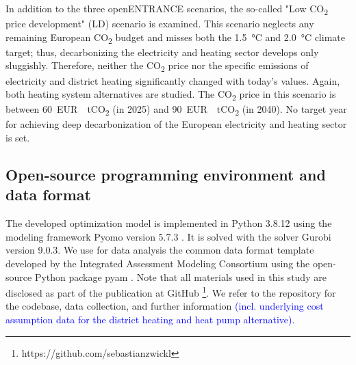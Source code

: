 In addition to the three openENTRANCE scenarios, the so-called "Low CO\textsubscript{2} price development" (LD) scenario is examined. This scenario neglects any remaining European CO\textsubscript{2} budget and misses both the  \SI{1.5}{\degreeCelsius} and \SI{2.0}{\degreeCelsius} climate target; thus, decarbonizing the electricity and heating sector develops only sluggishly. Therefore, neither the CO\textsubscript{2} price nor the specific emissions of electricity and district heating significantly changed with today's values. Again, both heating system alternatives are studied. The CO\textsubscript{2} price in this scenario is between \SI{60}{EUR \per tCO_{2}} (in 2025) and \SI{90}{EUR \per tCO_{2}} (in 2040). No target year for achieving deep decarbonization of the European electricity and heating sector is set. 

\subsection{Open-source programming environment and data format}\label{met:os}
The developed optimization model is implemented in Python 3.8.12 using the modeling framework Pyomo version 5.7.3 \cite{hart2017optimization}. It is solved with the solver Gurobi version 9.0.3. We use for data analysis the common data format template developed by the Integrated Assessment Modeling Consortium using the open-source Python package pyam \cite{huppmann2021pyam}. Note that all materials used in this study are disclosed as part of the publication at GitHub \footnote{https://github.com/sebastianzwickl}. We refer to the repository \textcolor{blue}{\cite{zwickl}} for the codebase, data collection, and further information \textcolor{blue}{(incl. underlying cost assumption data for the district heating and heat pump alternative).}